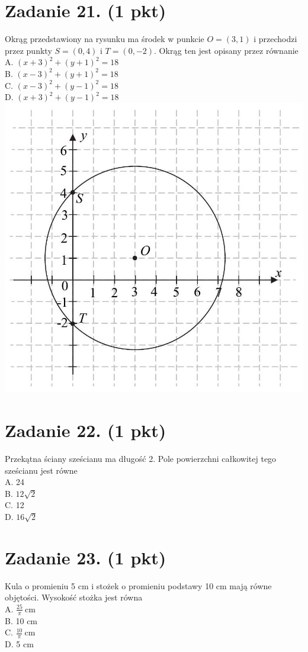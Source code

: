 \documentclass[10pt]{article}
\begin{document}
\section*{Zadanie 21. (1 pkt)}
Okrąg przedstawiony na rysunku ma środek w punkcie \(O=(3,1)\) i przechodzi przez punkty \(S=(0,4)\) i \(T=(0,-2)\). Okrąg ten jest opisany przez równanie\\
A. \((x+3)^{2}+(y+1)^{2}=18\)\\
B. \((x-3)^{2}+(y+1)^{2}=18\)\\
C. \((x-3)^{2}+(y-1)^{2}=18\)\\
D. \((x+3)^{2}+(y-1)^{2}=18\)\\
\includegraphics[max width=\textwidth, center]{2024_11_21_e19607c15353cb4d7e48g-10}

\section*{Zadanie 22. (1 pkt)}
Przekątna ściany sześcianu ma długość 2. Pole powierzchni całkowitej tego sześcianu jest równe\\
A. 24\\
B. \(12 \sqrt{2}\)\\
C. 12\\
D. \(16 \sqrt{2}\)

\section*{Zadanie 23. (1 pkt)}
Kula o promieniu 5 cm i stożek o promieniu podstawy 10 cm mają równe objętości. Wysokość stożka jest równa\\
A. \(\frac{25}{\pi} \mathrm{~cm}\)\\
B. 10 cm\\
C. \(\frac{10}{\pi} \mathrm{~cm}\)\\
D. 5 cm
\end{document}
